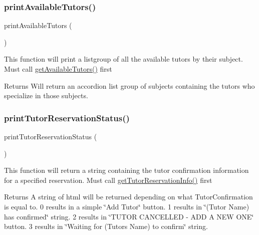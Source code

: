 \subsubsection{\texorpdfstring{printAvailableTutors()}{printAvailableTutors()}}
{\footnotesize\ttfamily print\+Available\+Tutors (\begin{DoxyParamCaption}{ }\end{DoxyParamCaption})}

This function will print a listgroup of all the available tutors by their subject. Must call \mbox{\hyperlink{_tutor___selection_8class_8php_a82ba4a18d02d84b563e0ed644c4a846e}{get\+Available\+Tutors()}} first \begin{DoxyReturn}{Returns}
Will return an accordion list group of subjects containing the tutors who specialize in those subjects. 
\end{DoxyReturn}
\mbox{\label{_tutor___selection_8class_8php_a8d1cd85c5c7884b46ddce6e94f0bc585}} 
\subsubsection{\texorpdfstring{printTutorReservationStatus()}{printTutorReservationStatus()}}
{\footnotesize\ttfamily print\+Tutor\+Reservation\+Status (\begin{DoxyParamCaption}{ }\end{DoxyParamCaption})}

This function will return a string containing the tutor confirmation information for a specified reservation. Must call \mbox{\hyperlink{_tutor___selection_8class_8php_aa55c439250d7b602d25701d20080575c}{get\+Tutor\+Reservation\+Info()}} first \begin{DoxyReturn}{Returns}
A string of html will be returned depending on what Tutor\+Confirmation is equal to. 0 results in a simple \char`\"{}\+Add Tutor\char`\"{} button. 1 results in \char`\"{}(\+Tutor Name) has confirmed\char`\"{} string. 2 results in \char`\"{}\+T\+U\+T\+O\+R C\+A\+N\+C\+E\+L\+L\+E\+D -\/ A\+D\+D A N\+E\+W O\+N\+E\char`\"{} button. 3 results in \char`\"{}\+Waiting for (\+Tutor\textquotesingle{}s Name) to confirm\char`\"{} string. 
\end{DoxyReturn}
\mbox{\label{_tutor___selection_8class_8php_a78fc1624ae4a44a300484ac00e0b9a96}} 
